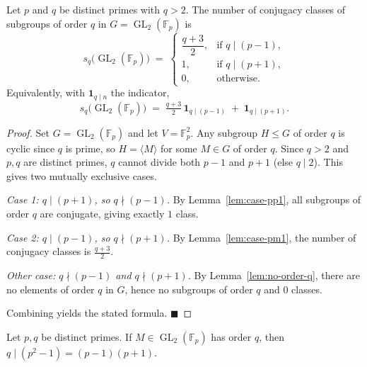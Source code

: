 


\begin{theorem}\label{thm:conj-classes-order-q}
Let $p$ and $q$ be distinct primes with $q > 2$. The number of conjugacy classes of subgroups of order $q$ in $G = \operatorname{GL}_2(\mathbb{F}_p)$ is
\[
  s_q\!\bigl(\operatorname{GL}_2(\mathbb{F}_p)\bigr)
  \;=\;
  \begin{cases}
    \dfrac{q+3}{2}, & \text{if } q \mid (p-1),\\[4pt]
    1, & \text{if } q \mid (p+1),\\[4pt]
    0, & \text{otherwise.}
  \end{cases}
\]
Equivalently, with $\mathbf{1}_{q\mid n}$ the indicator,
\[
  s_q\!\bigl(\operatorname{GL}_2(\mathbb{F}_p)\bigr)
  \;=\;
  \tfrac{q+3}{2}\,\mathbf{1}_{q\mid (p-1)} \;+\; \mathbf{1}_{q\mid (p+1)} .
\]
\end{theorem}

\begin{proof}
Set $G = \operatorname{GL}_2(\mathbb{F}_p)$ and let $V = \mathbb{F}_p^2$. Any subgroup $H \le G$ of order $q$ is cyclic since $q$ is prime, so $H = \langle M \rangle$ for some $M \in G$ of order $q$. Since $q > 2$ and $p,q$ are distinct primes, $q$ cannot divide both $p-1$ and $p+1$ (else $q \mid 2$). This gives two mutually exclusive cases.

\medskip\noindent\emph{Case 1: $q \mid (p+1)$, so $q \nmid (p-1)$.} By Lemma~\ref{lem:case-pp1}, all subgroups of order $q$ are conjugate, giving exactly $1$ class.

\medskip\noindent\emph{Case 2: $q \mid (p-1)$, so $q \nmid (p+1)$.} By Lemma~\ref{lem:case-pm1}, the number of conjugacy classes is $\tfrac{q+3}{2}$.

\medskip\noindent\emph{Other case: $q \nmid (p-1)$ and $q \nmid (p+1)$.} By Lemma~\ref{lem:no-order-q}, there are no elements of order $q$ in $G$, hence no subgroups of order $q$ and $0$ classes.

Combining yields the stated formula. $\blacksquare$
\end{proof}

\begin{lemma}\label{lem:order-divides-p2-1}
\leanok
Let $p,q$ be distinct primes. If $M \in \operatorname{GL}_2(\mathbb{F}_p)$ has order $q$, then $q \mid (p^2 - 1) = (p-1)(p+1)$.
\end{lemma}

